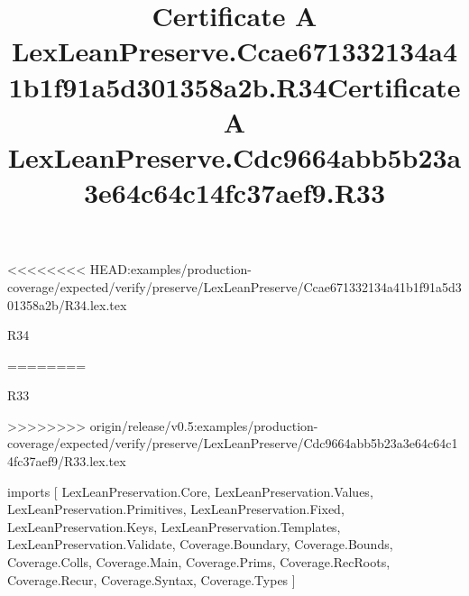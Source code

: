 <<<<<<<< HEAD:examples/production-coverage/expected/verify/preserve/LexLeanPreserve/Ccae671332134a41b1f91a5d301358a2b/R34.lex.tex
\begin{lexlean}{R34}
\title{Certificate A LexLeanPreserve.Ccae671332134a41b1f91a5d301358a2b.R34}
========
\begin{lexlean}{R33}
\title{Certificate A LexLeanPreserve.Cdc9664abb5b23a3e64c64c14fc37aef9.R33}
>>>>>>>> origin/release/v0.5:examples/production-coverage/expected/verify/preserve/LexLeanPreserve/Cdc9664abb5b23a3e64c64c14fc37aef9/R33.lex.tex
\begin{coremodule}
imports [
  LexLeanPreservation.Core,
  LexLeanPreservation.Values,
  LexLeanPreservation.Primitives,
  LexLeanPreservation.Fixed,
  LexLeanPreservation.Keys,
  LexLeanPreservation.Templates,
  LexLeanPreservation.Validate,
  Coverage.Boundary,
  Coverage.Bounds,
  Coverage.Colls,
  Coverage.Main,
  Coverage.Prims,
  Coverage.RecRoots,
  Coverage.Recur,
  Coverage.Syntax,
  Coverage.Types
]


\end{coremodule}
\end{lexlean}
\end{lexlean}
